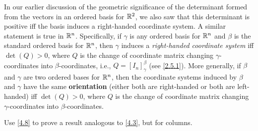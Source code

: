 \begin{note}
  In our earlier discussion of the geometric significance of the determinant formed from the vectors in an ordered basis for \(\mathbb{R}^2\), we also saw that this determinant is positive iff the basis induces a right-handed coordinate system.
  A similar statement is true in \(\mathbb{R}^n\).
  Specifically, if \(\gamma\) is any ordered basis for \(\mathbb{R}^n\) and \(\beta\) is the standard ordered basis for \(\mathbb{R}^n\), then \(\gamma\) induces a \emph{right-handed coordinate system} iff \(\det(Q) > 0\), where \(Q\) is the change of coordinate matrix changing \(\gamma\)-coordinates into \(\beta\)-coordinates, i.e., \(Q = [I_n]_{\gamma}^{\beta}\)
  (see \cref{2.5.1}).
  More generally, if \(\beta\) and \(\gamma\) are two ordered bases for \(\mathbb{R}^n\), then the coordinate systems induced by \(\beta\) and \(\gamma\) have the same \textbf{orientation} (either both are right-handed or both are left-handed) iff \(\det(Q) > 0\), where \(Q\) is the change of coordinate matrix changing \(\gamma\)-coordinates into \(\beta\)-coordinates.
\end{note}

\exercisesection

\setcounter{ex}{7}
\begin{ex}\label{ex:4.3.8}
  Use \cref{4.8} to prove a result analogous to \cref{4.3}, but for columns.
\end{ex}

